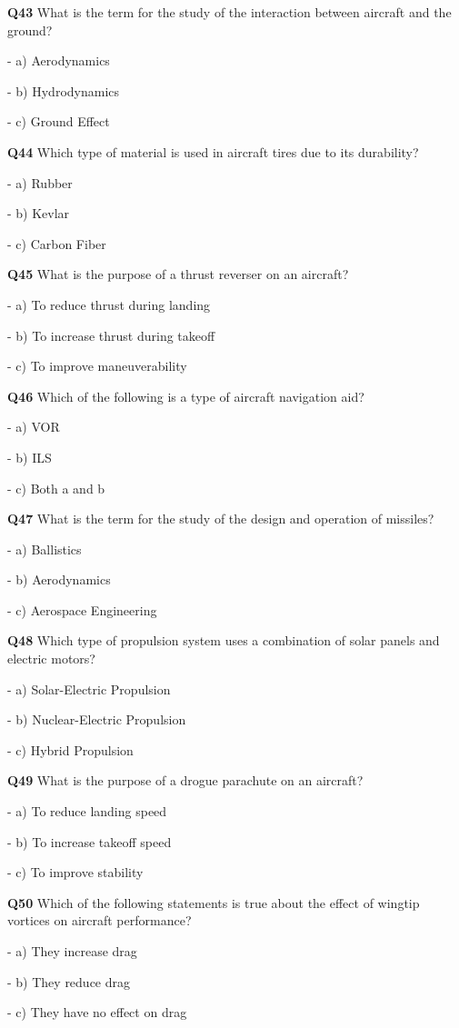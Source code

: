 \textbf{Q43} What is the term for the study of the interaction between aircraft and the ground?\par
\quad - a) Aerodynamics\par
\quad - b) Hydrodynamics\par
\quad - c) Ground Effect\par

\textbf{Q44} Which type of material is used in aircraft tires due to its durability?\par
\quad - a) Rubber\par
\quad - b) Kevlar\par
\quad - c) Carbon Fiber\par

\textbf{Q45} What is the purpose of a thrust reverser on an aircraft?\par
\quad - a) To reduce thrust during landing\par
\quad - b) To increase thrust during takeoff\par
\quad - c) To improve maneuverability\par

\textbf{Q46} Which of the following is a type of aircraft navigation aid?\par
\quad - a) VOR\par
\quad - b) ILS\par
\quad - c) Both a and b\par

\textbf{Q47} What is the term for the study of the design and operation of missiles?\par
\quad - a) Ballistics\par
\quad - b) Aerodynamics\par
\quad - c) Aerospace Engineering\par

\textbf{Q48} Which type of propulsion system uses a combination of solar panels and electric motors?\par
\quad - a) Solar-Electric Propulsion\par
\quad - b) Nuclear-Electric Propulsion\par
\quad - c) Hybrid Propulsion\par

\textbf{Q49} What is the purpose of a drogue parachute on an aircraft?\par
\quad - a) To reduce landing speed\par
\quad - b) To increase takeoff speed\par
\quad - c) To improve stability\par

\textbf{Q50} Which of the following statements is true about the effect of wingtip vortices on aircraft performance?\par
\quad - a) They increase drag\par
\quad - b) They reduce drag\par
\quad - c) They have no effect on drag\par